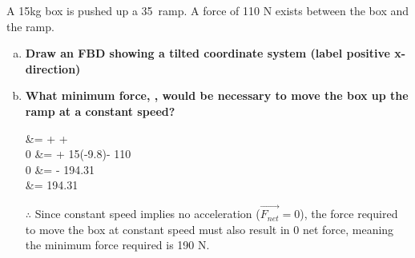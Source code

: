 \documentclass{agony}
\begin{document}
\begin{prob}
	A 15kg box is pushed up a 35\textdegree~ramp.
	A force of 110 N exists between the box and the ramp.
	\begin{enumerate}[(a)]
		\item \textbf{Draw an FBD showing a tilted coordinate system (label positive x-direction)}\\
		      \begin{center}
			      
		      \end{center}
		\item \textbf{What minimum force, , would be  necessary to move the box up the ramp at a constant speed?}
		      \begin{solution}
			       &=  +  + \\
			      0 &=  + 15(-9.8)\degree - 110\\
			      0 &=  - 194.31\\
			       &= 194.31~
		      \end{solution}
		      $\therefore$ Since constant speed implies no acceleration ($\vec{F_{net}}=0$), the force required to move the box at constant speed must also result in 0 net force, meaning the minimum force required is 190 N.
	\end{enumerate}
\end{prob}
\end{document}
